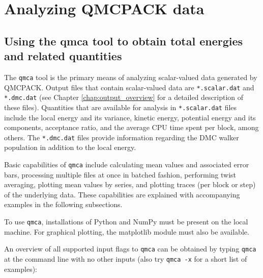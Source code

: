 \chapter{Analyzing QMCPACK data}
\label{chap:analyzing}

\section{Using the qmca tool to obtain total energies and related quantities}
\label{sec:qmca}

The \texttt{qmca} tool is the primary means of analyzing scalar-valued 
data generated by QMCPACK.  Output files that contain scalar-valued data 
are \texttt{*.scalar.dat} and \texttt{*.dmc.dat} (see Chapter 
\ref{chap:output_overview} for a detailed description of these files).
Quantities that are available for analysis in \texttt{*.scalar.dat} files 
include the local energy and its variance, kinetic energy, 
potential energy and its components,
acceptance ratio, and the average CPU time spent per block, among 
others.  The \texttt{*.dmc.dat} files provide information regarding 
the DMC walker population in addition to the local energy.  

Basic capabilities of \texttt{qmca} include calculating mean values 
and associated error bars, processing multiple files at once in batched 
fashion, performing twist averaging, plotting mean values by series, 
and plotting traces (per block or step) of the underlying data.  
These capabilities are explained with accompanying examples in the 
following subsections.

To use \texttt{qmca}, installations of Python and NumPy must be 
present on the local machine.  For graphical plotting, the matplotlib module 
must also be available.

An overview of all supported input flags to \texttt{qmca} can be 
obtained by typing \texttt{qmca} at the command line with no 
other inputs (also try \texttt{qmca -x} for a short list of examples):

